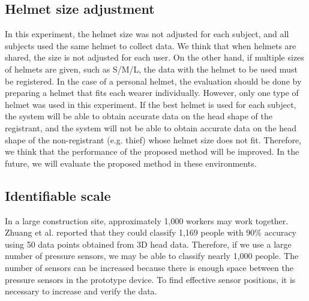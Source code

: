 \documentclass[english,preprint,JIP]{ipsj}
\begin{document}
\subsection{Helmet size adjustment}
\label{sec:helmet_size_adjustment}
In this experiment, the helmet size was not adjusted for each subject, and all subjects used the same helmet to collect data. We think that when helmets are shared, the size is not adjusted for each user. On the other hand, if multiple sizes of helmets are given, such as S/M/L, the data with the helmet to be used must be registered. In the case of a personal helmet, the evaluation should be done by preparing a helmet that fits each wearer individually. However, only one type of helmet was used in this experiment. If the best helmet is used for each subject, the system will be able to obtain accurate data on the head shape of the registrant, and the system will not be able to obtain accurate data on the head shape of the non-registrant (e.g. thief) whose helmet size does not fit. Therefore, we think that the performance of the proposed method will be improved. In the future, we will evaluate the proposed method in these environments.


\subsection{Identifiable scale}
\label{sec:identifiable_scale}
In a large construction site, approximately 1,000 workers may work together. Zhuang et al.\cite{head_shape_variations} reported that they could classify 1,169 people with 90\% accuracy using 50 data points obtained from 3D head data. Therefore, if we use a large number of pressure sensors, we may be able to classify nearly 1,000 people. The number of sensors can be increased because there is enough space between the pressure sensors in the prototype device. To find effective sensor positions, it is necessary to increase and verify the data.


\end{document}
